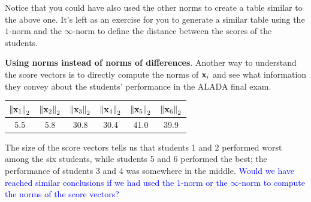\begin{boxedstuff}
\begin{example}
        \noindent Notice that you could have also used the other norms to create a table similar to the above one. It's left as an exercise for you to generate a similar table using the $1$-norm and the $\infty$-norm to define the distance between the scores of the students.

        \textbf{Using norms instead of norms of differences}. Another way to understand the score vectors is to directly compute the norms of $\mathbf{x}_i$ and see what information they convey about the students' performance in the ALADA final exam.
        \begin{small}
            \begin{center}
                    \begin{tabular}{|c|c|c|c|c|c|}
                    \hline
                    $\left\lVert \mathbf{x}_1 \right\rVert_2$ & $\left\lVert \mathbf{x}_2 \right\rVert_2$ & $\left\lVert \mathbf{x}_3 \right\rVert_2$ & $\left\lVert \mathbf{x}_4 \right\rVert_2$ & $\left\lVert \mathbf{x}_5 \right\rVert_2$ & $\left\lVert \mathbf{x}_6 \right\rVert_2$ \\ \hline
                    5.5 & 5.8 & 30.8 & 30.4 & 41.0 & 39.9 \\ \hline
                    \end{tabular}
            \end{center}
        \end{small}
        The size of the score vectors tells us that students 1 and 2 performed worst among the six students, while students 5 and 6 performed the best; the performance of students 3 and 4 was somewhere in the middle. \textcolor{blue}{Would we have reached similar conclusions if we had used the $1$-norm or the $\infty$-norm to compute the norms of the score vectors?}
        \label{example:alada-scores}
    \end{example}
\end{boxedstuff}

